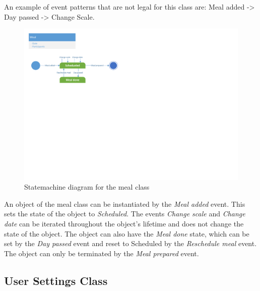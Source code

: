 An example of event patterns that are not legal for this class are: Meal added -> Day passed -> Change Scale.

\begin{figure}[H]
	\centering
	\includegraphics[clip=true, trim=0.5cm 13cm 16.5cm 0.5cm]{Development/ProblemDomain/MealClass.pdf}
	\caption{Statemachine diagram for the meal class} \label{MealClass}
\end{figure}

An object of the meal class can be instantiated by the \textit{Meal added} event. This sets the state of the object to \textit{Scheduled}. The events \textit{Change scale} and \textit{Change date} can be iterated throughout the object's lifetime and does not change the state of the object. The object can also have the \textit{Meal done} state, which can be set by the \textit{Day passed} event and reset to Scheduled by the \textit{Reschedule meal} event. The object can only be terminated by the \textit{Meal prepared} event.

\subsection{User Settings Class}

